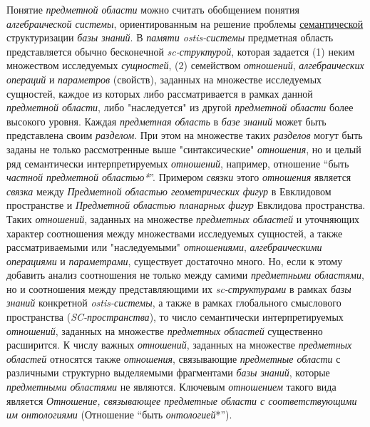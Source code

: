 \begin{SCn}
{	Понятие \textit{предметной области} можно считать обобщением понятия \textit{алгебраической системы}, ориентированным на решение проблемы \uline{семантической} структуризации \textit{базы знаний}. В \textit{памяти ostis-системы} предметная область представляется обычно бесконечной \textit{sc-структурой}, которая задается (1) неким множеством исследуемых \textit{сущностей}, (2) семейством \textit{отношений}, \textit{алгебраических операций} и \textit{параметров} (свойств), заданных на множестве исследуемых сущностей, каждое из которых либо рассматривается в рамках данной \textit{предметной области}, либо "наследуется"{} из другой \textit{предметной области} более высокого уровня. Каждая \textit{предметная область} в \textit{базе знаний} может быть представлена своим \textit{разделом}. При этом на множестве таких \textit{разделов} могут быть заданы не только рассмотренные выше "синтаксические"{} \textit{отношения}, но и целый ряд семантически интерпретируемых \textit{отношений}, например, отношение ``быть \textit{частной предметной областью*}''{}. Примером \textit{связки} этого \textit{отношения} является \textit{связка} между \textit{Предметной областью геометрических фигур} в Евклидовом пространстве и \textit{Предметной областью планарных фигур} Евклидова пространства. Таких \textit{отношений}, заданных на множестве \textit{предметных областей} и уточняющих характер соотношения между множествами исследуемых сущностей, а также рассматриваемыми или "наследуемыми"{} \textit{отношениями}, \textit{алгебраическими операциями} и \textit{параметрами}, существует достаточно много. Но, если к этому добавить анализ соотношения не только между самими \textit{предметными областями}, но и соотношения между представляющими их \textit{sc-структурами} в рамках \textit{базы знаний} конкретной \textit{ostis-системы}, а также в рамках глобального смыслового пространства (\textit{SC-пространства}), то число семантически интерпретируемых \textit{отношений}, заданных на множестве \textit{предметных областей} существенно расширится. К числу важных \textit{отношений}, заданных на множестве \textit{предметных областей} относятся также \textit{отношения}, связывающие \textit{предметные области} с различными структурно выделяемыми фрагментами \textit{базы знаний}, которые \textit{предметными областями} не являются. Ключевым \textit{отношением} такого вида является \textit{Отношение, связывающее предметные области с соответствующими им онтологиями} (Отношение ``быть \textit{онтологией}*'').} 
\end{SCn}
